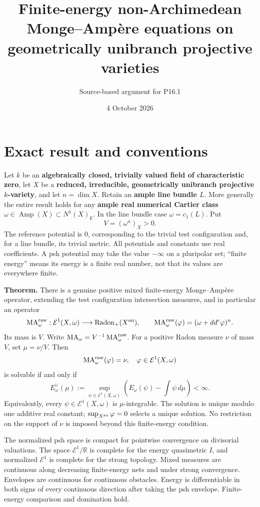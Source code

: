 \documentclass[11pt]{article}
\title{Finite-energy non-Archimedean Monge--Ampère equations on
geometrically unibranch projective varieties}
\author{Source-based argument for P16.1}
\date{4 October 2026}
\begin{document}
\maketitle
\section{Exact result and
conventions}\label{exact-result-and-conventions}

Let \(k\) be an \textbf{algebraically closed, trivially valued field of
characteristic zero}, let \(X\) be a \textbf{reduced, irreducible,
geometrically unibranch projective \(k\)-variety}, and let \(n=\dim X\).
Retain an \textbf{ample line bundle \(L\)}. More generally the entire
result holds for any \textbf{ample real numerical Cartier class}
\(\omega\in\operatorname{Amp}(X)\subset N^1(X)_{\mathbb R}\). In the
line bundle case \(\omega=c_1(L)\). Put \[V=(\omega^n)_X>0.\] The
reference potential is \(0\), corresponding to the trivial test
configuration and, for a line bundle, its trivial metric. All potentials
and constants use real coefficients. A psh potential may take the value
\(-\infty\) on a pluripolar set; ``finite energy'' means its energy is a
finite real number, not that its values are everywhere finite.

\textbf{Theorem.} There is a genuine positive mixed finite-energy
Monge--Ampère operator, extending the test configuration intersection
measures, and in particular an operator
\[\operatorname{MA}^{\rm raw}_\omega:\mathcal E^1(X,\omega)\longrightarrow\operatorname{Radon}_+(X^{\rm an}),\qquad
\operatorname{MA}^{\rm raw}_\omega(\varphi)=(\omega+dd^c\varphi)^n.\]
Its mass is \(V\). Write
\(\operatorname{MA}_\omega=V^{-1}\operatorname{MA}^{\rm raw}_\omega\).
For a positive Radon measure \(\nu\) of mass \(V\), set \(\mu=\nu/V\).
Then
\[\operatorname{MA}^{\rm raw}_\omega(\varphi)=\nu,\quad\varphi\in\mathcal E^1(X,\omega)\]
is solvable if and only if
\[E^\vee_\omega(\mu):=\sup_{\psi\in\mathcal E^1(X,\omega)}\left(E_\omega(\psi)-\int\psi\,d\mu\right)<\infty.\]
Equivalently, every \(\psi\in\mathcal E^1(X,\omega)\) is
\(\mu\)-integrable. The solution is unique modulo one additive real
constant; \(\sup_{X^{\rm an}}\varphi=0\) selects a unique solution. No
restriction on the support of \(\nu\) is imposed beyond this
finite-energy condition.

The normalized psh space is compact for pointwise convergence on
divisorial valuations. The space \(\mathcal E^1/\mathbb R\) is complete
for the energy quasimetric \(I\), and normalized \(\mathcal E^1\) is
complete for the strong topology. Mixed measures are continuous along
decreasing finite-energy nets and under strong convergence. Envelopes
are continuous for continuous obstacles. Energy is differentiable in
both signs of every continuous direction after taking the psh envelope.
Finite-energy comparison and domination hold.
\end{document}
